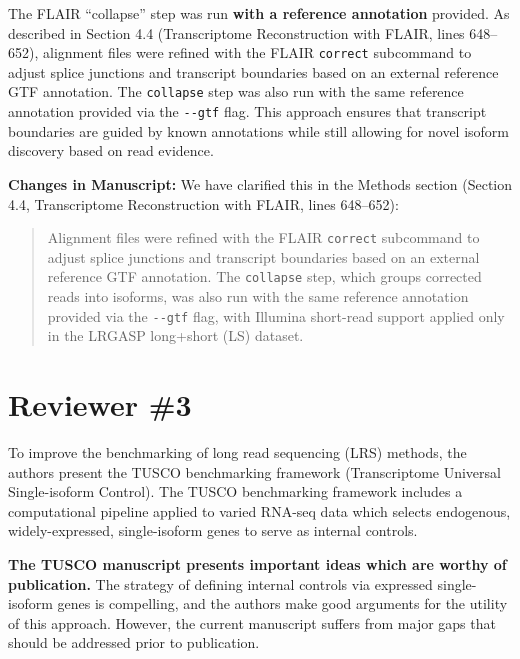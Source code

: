 \documentclass[11pt]{article}
\begin{document}
\begin{responseboxnew}
The FLAIR ``collapse'' step was run \textbf{with a reference annotation} provided. As described in Section 4.4 (Transcriptome Reconstruction with FLAIR, lines 648--652), alignment files were refined with the FLAIR \texttt{correct} subcommand to adjust splice junctions and transcript boundaries based on an external reference GTF annotation. The \texttt{collapse} step was also run with the same reference annotation provided via the \texttt{-{}-gtf} flag. This approach ensures that transcript boundaries are guided by known annotations while still allowing for novel isoform discovery based on read evidence.

\vspace{0.3cm}
\textbf{Changes in Manuscript:} We have clarified this in the Methods section (Section 4.4, Transcriptome Reconstruction with FLAIR, lines 648--652):

\begin{quote}
Alignment files were refined with the FLAIR \texttt{correct} subcommand to adjust splice junctions and transcript boundaries based on an external reference GTF annotation. The \texttt{collapse} step, which groups corrected reads into isoforms, was also run with the same reference annotation provided via the \texttt{-{}-gtf} flag, with Illumina short-read support applied only in the LRGASP long+short (LS) dataset.
\end{quote}
\end{responseboxnew}

\newpage

\section{Reviewer \#3}

\begin{positiveremarks}
To improve the benchmarking of long read sequencing (LRS) methods, the authors present the TUSCO benchmarking framework (Transcriptome Universal Single-isoform Control). The TUSCO benchmarking framework includes a computational pipeline applied to varied RNA-seq data which selects endogenous, widely-expressed, single-isoform genes to serve as internal controls.

\vspace{0.2cm}
\textbf{The TUSCO manuscript presents important ideas which are worthy of publication.} The strategy of defining internal controls via expressed single-isoform genes is compelling, and the authors make good arguments for the utility of this approach. However, the current manuscript suffers from major gaps that should be addressed prior to publication.
\end{positiveremarks}
\end{document}
